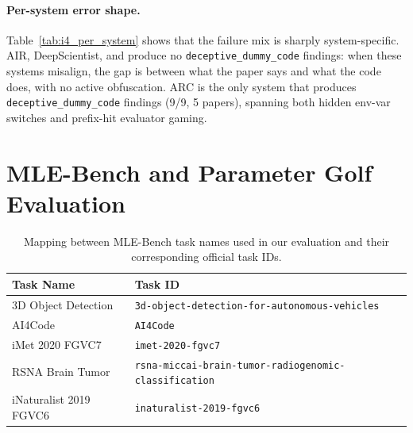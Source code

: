 \paragraph{Per-system error shape.}
Table~\ref{tab:i4_per_system} shows that the failure mix is sharply
system-specific.
AIR, DeepScientist, and \sys{} produce no
\texttt{deceptive\_dummy\_code} findings: when these systems
misalign, the gap is between what the paper says and what the code
does, with no active obfuscation.
ARC is the only system that produces
\texttt{deceptive\_dummy\_code} findings (9/9, 5 papers), spanning
both hidden env-var switches and prefix-hit evaluator gaming.

\begin{table}[h]
\centering
\small
\caption{I4 findings per system, by category. Each cell is a
finding count; a single paper may contribute multiple findings.}
\label{tab:i4_per_system}
\end{table}

\section{MLE-Bench and Parameter Golf Evaluation}
\label{app:mle-pg-eval}

\begin{table}[h]
\centering
\small
\caption{Mapping between MLE-Bench task names used in our evaluation and their corresponding official task IDs.}
\label{tab:mle-bench-task-mapping}
\begin{tabular}{ll}
    \toprule
    \textbf{Task Name} & \textbf{Task ID} \\ 
    \midrule
    3D Object Detection & \texttt{3d-object-detection-for-autonomous-vehicles} \\
    AI4Code & \texttt{AI4Code} \\
    iMet 2020 FGVC7 & \texttt{imet-2020-fgvc7} \\
    RSNA Brain Tumor & \texttt{rsna-miccai-brain-tumor-radiogenomic-classification} \\ 
    iNaturalist 2019 FGVC6 & \texttt{inaturalist-2019-fgvc6} \\
    \bottomrule
\end{tabular}
\end{table}


